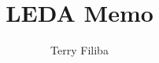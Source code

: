 \documentclass[fleqn, onecolumn]{article}
\begin{document}
\title{LEDA Memo}
\date{}
\author{Terry Filiba}
\maketitle




\end{document}
